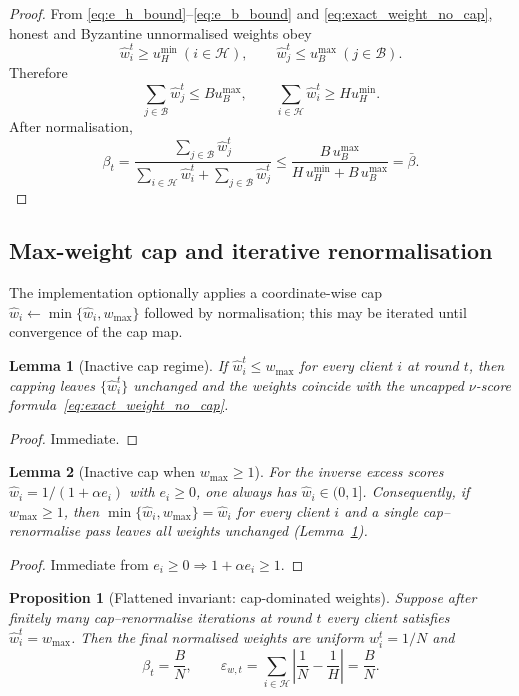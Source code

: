 \documentclass[11pt,a4paper]{article}
\newtheorem{lemma}{Lemma}
\newtheorem{proposition}{Proposition}
\theoremstyle{remark}
\newcommand{\HH}{\mathcal{H}}
\newcommand{\BB}{\mathcal{B}}
\begin{document}
\begin{proof}
From \eqref{eq:e_h_bound}--\eqref{eq:e_b_bound} and
\eqref{eq:exact_weight_no_cap}, honest and Byzantine unnormalised weights obey
\[
    \hat w_i^t \ge u_H^{\min}\ (i\in\HH),
    \qquad
    \hat w_j^t \le u_B^{\max}\ (j\in\BB).
\]
Therefore
\[
    \sum_{j\in\BB}\hat w_j^t \le B u_B^{\max},
    \qquad
    \sum_{i\in\HH}\hat w_i^t \ge H u_H^{\min}.
\]
After normalisation,
\[
    \beta_t
    =
    \frac{\sum_{j\in\BB}\hat w_j^t}
         {\sum_{i\in\HH}\hat w_i^t+\sum_{j\in\BB}\hat w_j^t}
    \le
    \frac{B\,u_B^{\max}}{H\,u_H^{\min}+B\,u_B^{\max}}
    =\bar\beta.
\]
\end{proof}

\subsection{Max-weight cap and iterative renormalisation}

The implementation optionally applies a coordinate-wise cap
\(\hat w_i\gets \min\{\hat w_i,w_{\max}\}\) followed by normalisation; this may
be iterated until convergence of the cap map.

\begin{lemma}[Inactive cap regime]
\label{lem:cap_inactive}
If \(\hat w_i^t\le w_{\max}\) for every client \(i\) at round \(t\), then
capping leaves \(\{\hat w_i^t\}\) unchanged and the weights coincide with the
uncapped \(\nu\)-score formula~\eqref{eq:exact_weight_no_cap}.
\end{lemma}

\begin{proof}
Immediate.
\end{proof}

\begin{lemma}[Inactive cap when \(w_{\max}\ge 1\)]
\label{lem:cap_honest_safe}
For the inverse excess scores \(\hat w_i=1/(1+\alpha e_i)\) with \(e_i\ge 0\),
one always has \(\hat w_i\in(0,1]\).
Consequently, if \(w_{\max}\ge 1\), then \(\min\{\hat w_i,w_{\max}\}=\hat w_i\)
for every client \(i\) and a single cap--renormalise pass leaves all weights
unchanged (Lemma~\ref{lem:cap_inactive}).
\end{lemma}

\begin{proof}
Immediate from \(e_i\ge 0\Rightarrow 1+\alpha e_i\ge 1\).
\end{proof}

\begin{proposition}[Flattened invariant: cap-dominated weights]
\label{prop:cap_flat}
Suppose after finitely many cap--renormalise iterations at round \(t\) every
client satisfies \(\hat w_i^t=w_{\max}\).
Then the final normalised weights are uniform \(w_i^t=1/N\) and
\begin{equation}
    \beta_t = \frac{B}{N},
    \qquad
    \varepsilon_{w,t}
    =
    \sum_{i\in\HH}\left|\frac{1}{N}-\frac{1}{H}\right|
    =
    \frac{B}{N}.
    \label{eq:flat_beta_eps}
\end{equation}
\end{proposition}
\end{document}
